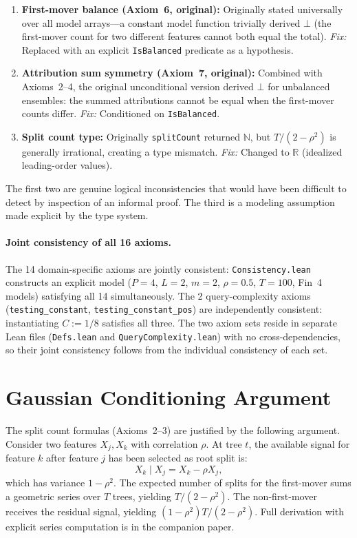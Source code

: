 \documentclass{article}
\begin{document}
\begin{enumerate}
\item \textbf{First-mover balance (Axiom~6, original):}
  Originally stated universally over all model arrays---a constant
  model function trivially derived $\bot$ (the first-mover count for
  two different features cannot both equal the total). \emph{Fix:}
  Replaced with an explicit \texttt{IsBalanced} predicate as a
  hypothesis.

\item \textbf{Attribution sum symmetry (Axiom~7, original):}
  Combined with Axioms~2--4, the original unconditional version
  derived $\bot$ for unbalanced ensembles: the summed attributions
  cannot be equal when the first-mover counts differ. \emph{Fix:}
  Conditioned on \texttt{IsBalanced}.

\item \textbf{Split count type:}
  Originally \texttt{splitCount} returned $\mathbb{N}$, but
  $T/(2-\rho^2)$ is generally irrational, creating a type mismatch.
  \emph{Fix:} Changed to $\mathbb{R}$ (idealized leading-order values).
\end{enumerate}

The first two are genuine logical inconsistencies that would have been
difficult to detect by inspection of an informal proof. The third is a
modeling assumption made explicit by the type system.

\paragraph{Joint consistency of all 16 axioms.}
The 14 domain-specific axioms are jointly consistent: \texttt{Consistency.lean}
constructs an explicit model ($P{=}4$, $L{=}2$, $m{=}2$, $\rho{=}0.5$,
$T{=}100$, Fin~4 models) satisfying all 14 simultaneously.
The 2 query-complexity axioms (\texttt{testing\_constant},
\texttt{testing\_constant\_pos})
are independently consistent: instantiating $C := 1/8$ satisfies all three.
The two axiom sets reside in separate Lean files
(\texttt{Defs.lean} and \texttt{QueryComplexity.lean}) with no
cross-dependencies, so their joint consistency follows from the
individual consistency of each set.

\section{Gaussian Conditioning Argument}

The split count formulas (Axioms~2--3) are justified by the following
argument. Consider two features $X_j, X_k$ with correlation $\rho$.
At tree $t$, the available signal for feature $k$ after feature $j$
has been selected as root split is:
\[
  X_k \mid X_j = X_k - \rho X_j,
\]
which has variance $1 - \rho^2$. The expected number of splits for the
first-mover sums a geometric series over $T$ trees, yielding
$T/(2 - \rho^2)$. The non-first-mover receives the residual signal,
yielding $(1-\rho^2)T/(2-\rho^2)$. Full derivation with explicit
series computation is in the companion paper.
\end{document}

